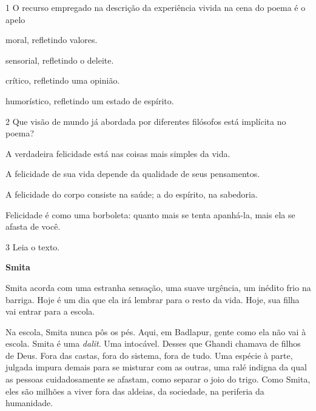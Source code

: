 \num{1} O recurso empregado na descrição da experiência vivida na cena do poema é o apelo

\begin{escolha}[itemsep=0pt]
\item moral, refletindo valores.

\item sensorial, refletindo o deleite.

\item crítico, refletindo uma opinião.

\item humorístico, refletindo um estado de espírito.
\end{escolha}

\num{2} Que visão de mundo já abordada por diferentes filósofos está implícita no poema?

\begin{escolha}[itemsep=0pt]
\item A verdadeira felicidade está nas coisas mais simples da vida.

\item A felicidade de sua vida depende da qualidade de seus pensamentos.

\item A felicidade do corpo consiste na saúde; a do espírito, na sabedoria.

\item Felicidade é como uma borboleta: quanto mais se tenta apanhá-la, mais ela se afasta de você.
\end{escolha}

\num{3} Leia o texto.

\begin{myquote}
\textbf{Smita}

Smita acorda com uma estranha sensação, uma suave urgência, um inédito
frio na barriga. Hoje é um dia que ela irá lembrar para o resto da vida.
Hoje, sua filha vai entrar para a escola.

Na escola, Smita nunca pôs os pés. Aqui, em Badlapur, gente como ela não
vai à escola. Smita é uma \emph{dalit}. Uma intocável. Desses que Ghandi
chamava de filhos de Deus. Fora das castas, fora do sistema, fora de
tudo. Uma espécie à parte, julgada impura demais para se misturar com as
outras, uma ralé indigna da qual as pessoas cuidadosamente se afastam,
como separar o joio do trigo. Como Smita, eles são milhões a viver fora
das aldeias, da sociedade, na periferia da humanidade.

\end{myquote}

